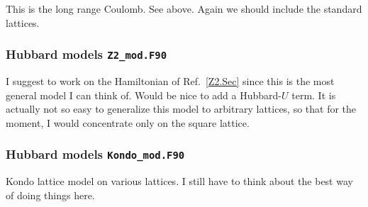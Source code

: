 This is the long range Coulomb. See above.    Again we should include the   standard lattices. 

\subsubsection{Hubbard models   \texttt{Z2\_mod.F90}}
I suggest to work on the  Hamiltonian of Ref.~\ref{Z2.Sec} since this is the most general  model I can think of.   Would be nice to add a Hubbard-$U$ term.  It is actually not so easy to generalize this model to 
arbitrary lattices, so that for the moment, I would concentrate only on the square lattice. 

\subsubsection{Hubbard models   \texttt{Kondo\_mod.F90}}
Kondo lattice model on various lattices.  I still have to think about the best way of doing things here. 